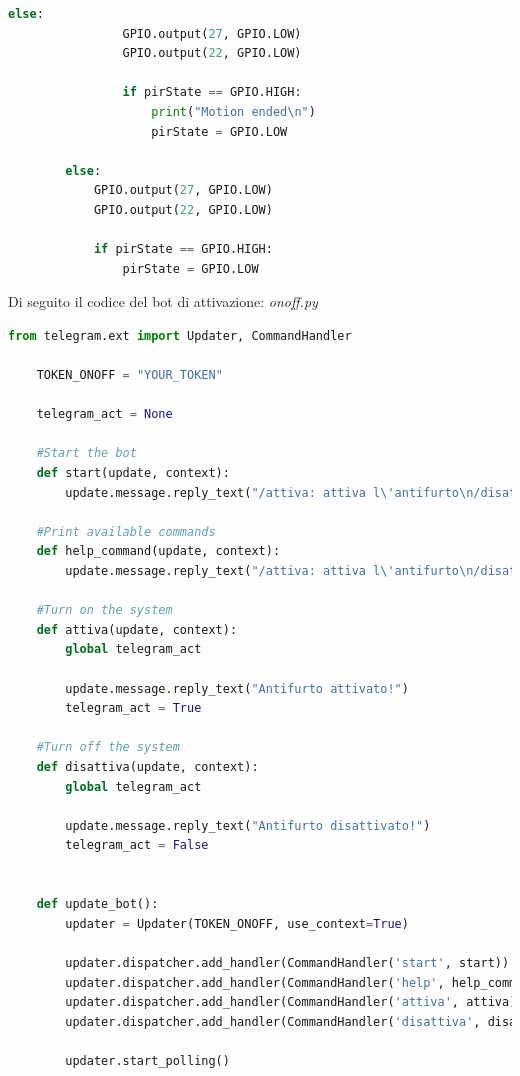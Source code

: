 \documentclass[12pt]{article}
\begin{document}
\begin{lstlisting}[language=Python]
        	else:
            	GPIO.output(27, GPIO.LOW)
            	GPIO.output(22, GPIO.LOW)

            	if pirState == GPIO.HIGH:
                	print("Motion ended\n")
                	pirState = GPIO.LOW

    	else:
        	GPIO.output(27, GPIO.LOW)
        	GPIO.output(22, GPIO.LOW)

        	if pirState == GPIO.HIGH:
            	pirState = GPIO.LOW
	\end{lstlisting}

	Di seguito il codice del bot di attivazione: \textit{onoff.py}
	\begin{lstlisting}[language=Python]
	from telegram.ext import Updater, CommandHandler

	TOKEN_ONOFF = "YOUR_TOKEN" 

	telegram_act = None

	#Start the bot
	def start(update, context):
    	update.message.reply_text("/attiva: attiva l\'antifurto\n/disattiva: disattiva l\'antifurto\n/help: visualizza i comandi")

	#Print available commands
	def help_command(update, context):
    	update.message.reply_text("/attiva: attiva l\'antifurto\n/disattiva: disattiva l\'antifurto\n/help: visualizza i comandi")

	#Turn on the system
	def attiva(update, context):
    	global telegram_act 

    	update.message.reply_text("Antifurto attivato!")
    	telegram_act = True

	#Turn off the system
	def disattiva(update, context):
   		global telegram_act

    	update.message.reply_text("Antifurto disattivato!")
   	 	telegram_act = False

    
	def update_bot():
    	updater = Updater(TOKEN_ONOFF, use_context=True)

    	updater.dispatcher.add_handler(CommandHandler('start', start))
    	updater.dispatcher.add_handler(CommandHandler('help', help_command))
    	updater.dispatcher.add_handler(CommandHandler('attiva', attiva))
    	updater.dispatcher.add_handler(CommandHandler('disattiva', disattiva))

    	updater.start_polling()
	\end{lstlisting}
	
\end{document}
